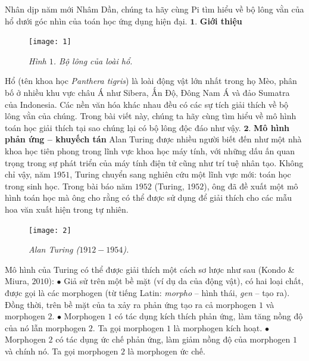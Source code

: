 \begin{multicols}{2}
	Nhân dịp năm mới Nhâm Dần, chúng ta hãy cùng Pi tìm hiểu về bộ lông vằn của hổ dưới góc nhìn của toán học ứng dụng hiện đại.
	\vskip 0.1cm
	$\pmb{1.}$ \textbf{\color{timhieukhoahoc}Giới thiệu}
	\begin{figure}[H]
		\vspace*{-5pt}
		\centering
		\captionsetup{labelformat= empty, justification=centering}
		\texttt{[image: 1]}
		\caption{\small\textit{\color{timhieukhoahoc}Hình $1$. Bộ lông của loài hổ.}}
		\vspace*{-10pt}
	\end{figure}
	Hổ (tên khoa học \textit{Panthera tigris}) là loài động vật lớn nhất trong họ Mèo, phân bố ở nhiều khu vực châu Á như Sibera, Ấn Độ, Đông Nam Á và đảo Sumatra của Indonesia. Các nền văn hóa khác nhau đều có các sự tích giải thích về bộ lông vằn của chúng. Trong bài viết này, chúng ta hãy cùng tìm hiểu về mô hình toán học giải thích tại sao chúng lại có bộ lông độc đáo như vậy.
	\vskip 0.1cm
	$\pmb{2.}$ \textbf{\color{timhieukhoahoc}Mô hình phản ứng -- khuyếch tán}
	\vskip 0.1cm
	Alan Turing được nhiều người biết đến như một nhà khoa học tiên phong trong lĩnh vực khoa học máy tính, với những dấu ấn quan trọng trong sự phát triển của máy tính điện tử cũng như trí tuệ nhân tạo. Không chỉ vậy, năm $1951$, Turing chuyển sang nghiên cứu một lĩnh vực mới: toán học trong sinh học. Trong bài báo năm $1952$ (Turing, $1952$), ông đã đề xuất một mô hình toán học mà ông cho rằng có thể được sử dụng để giải thích cho các mẫu hoa văn xuất hiện trong tự nhiên.
	\begin{figure}[H]
		\vspace*{-5pt}
		\centering
		\captionsetup{labelformat= empty, justification=centering}
		\texttt{[image: 2]}
		\caption{\small\textit{\color{timhieukhoahoc}Alan Turing ($1912 - 1954$).}}
		\vspace*{-10pt}
	\end{figure}
	Mô hình của Turing có thể được giải thích một cách sơ lược như sau (Kondo \& Miura, $2010$):
	\vskip 0.1cm 
	$\bullet$ Giả sử trên một bề mặt (ví dụ da của động vật), có hai loại chất, được gọi là các morphogen (từ tiếng Latin: \textit{morpho} -- hình thái, \textit{gen} -- tạo ra). Đồng thời, trên bề mặt của ta xảy ra phản ứng tạo ra cả morphogen $1$ và morphogen $2$. 
	\vskip 0.05cm
	$\bullet$ Morphogen $1$ có tác dụng kích thích phản ứng, làm tăng nồng độ của nó lẫn morphogen $2$. Ta gọi morphogen $1$ là morphogen kích hoạt.
	\vskip 0.05cm
	$\bullet$ Morphogen $2$ có tác dụng ức chế phản ứng, làm giảm nồng độ của morphogen $1$ và chính nó. Ta gọi morphogen $2$ là morphogen ức chế.

\end{multicols}
